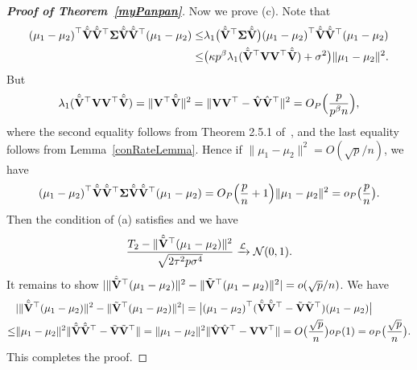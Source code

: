 \documentclass[times,sort&compress,3p]{elsarticle}
\theoremstyle{plain}
\theoremstyle{definition}
\theoremstyle{remark}
\begin{document}
\begin{appendices}
\begin{proof}[\textbf{Proof of Theorem~\ref{myPanpan}}]
Now we prove (c).
    Note that
    \begin{equation*}
        \begin{aligned}
             {(\mu_1-\mu_2)}^\top  \hat{\tilde{\mathbf{V}}}\hat{\tilde{\mathbf{V}}}^\top \boldsymbol{\Sigma} \hat{\tilde{\mathbf{V}}}\hat{\tilde{\mathbf{V}}}^\top (\mu_1-\mu_2)
            \leq &
             \lambda_1\big(\hat{\tilde{\mathbf{V}}}^\top \boldsymbol{\Sigma} \hat{\tilde{\mathbf{V}}}\big) {(\mu_1-\mu_2)}^\top  \hat{\tilde{\mathbf{V}}}\hat{\tilde{\mathbf{V}}}^\top (\mu_1-\mu_2)\\
            \leq & 
             \big(\kappa p^{\beta}\lambda_1(\hat{\tilde{\mathbf{V}}}^\top  \mathbf{V}\mathbf{V}^\top   \hat{\tilde{\mathbf{V}}})+\sigma^2\big)
             \|\mu_1-\mu_2\|^2.
        \end{aligned}
    \end{equation*}
    But
    \begin{equation*}
        \begin{aligned}
\lambda_1(\hat{\tilde{\mathbf{V}}}^\top  \mathbf{V}\mathbf{V}^\top   \hat{\tilde{\mathbf{V}}})
=\|\mathbf{V}^\top   \hat{\tilde{\mathbf{V}}}\|^2
            = \|\mathbf{V}\mathbf{V}^\top -\hat{\mathbf{V}}\hat{\mathbf{V}}^\top \|^2=O_P\Big(\frac{p}{p^{\beta}n}\Big),
        \end{aligned}
    \end{equation*}
    where the second equality follows from Theorem 2.5.1 of~\cite{matrixComputations}, and the last equality follows from Lemma~\ref{conRateLemma}. 
Hence if $\|\mu_1-\mu_2\|^2=O(\sqrt{p}/n)$, we have
$$
             {(\mu_1-\mu_2)}^\top  \hat{\tilde{\mathbf{V}}}\hat{\tilde{\mathbf{V}}}^\top \boldsymbol{\Sigma} \hat{\tilde{\mathbf{V}}}\hat{\tilde{\mathbf{V}}}^\top (\mu_1-\mu_2)=O_P\Big(\frac{p}{n}+1\Big)\|\mu_1-\mu_2\|^2=o_P\big(\frac{p}{n}\big).
$$
Then the condition of (a) satisfies and we have
$$
\frac{T_2-\|\hat{\tilde{\mathbf{V}}}^\top  (\mu_1-\mu_2)\|^2}{\sqrt{2\tau^2 p \sigma^4}}
\xrightarrow{\mathcal{L}}\mathcal{N}(0,1).
$$
It remains to show
$
|\|\hat{\tilde{\mathbf{V}}}^\top  (\mu_1-\mu_2)\|^2
-\|\tilde{\mathbf{V}}^\top  (\mu_1-\mu_2)\|^2|
=o(\sqrt{p}/n)
$.
    We have
    \begin{equation*}
        \begin{aligned}
            &|\|\hat{\tilde{\mathbf{V}}}^\top  (\mu_1-\mu_2)\|^2-\|\tilde{\mathbf{V}}^\top  (\mu_1-\mu_2)\|^2|=
            \big|{(\mu_1-\mu_2)}^\top (\hat{\tilde{\mathbf{V}}}\hat{\tilde{\mathbf{V}}}^\top -\tilde{\mathbf{V}}\tilde{\mathbf{V}}^\top )(\mu_1-\mu_2)\big|\\
            \leq &
            \|\mu_1-\mu_2\|^2 \|\hat{\tilde{\mathbf{V}}}\hat{\tilde{\mathbf{V}}}^\top -\tilde{\mathbf{V}}\tilde{\mathbf{V}}^\top \|
            = 
            \|\mu_1-\mu_2\|^2  \|\hat{\mathbf{V}}\hat{\mathbf{V}}^\top -\mathbf{V}\mathbf{V}^\top \|
            =O\big(\frac{\sqrt{p}}{n}\big)o_P(1)=o_P\big(\frac{\sqrt{p}}{n}\big).
        \end{aligned}
    \end{equation*}
This completes the proof.
\end{proof}


\end{appendices}
\end{document}
